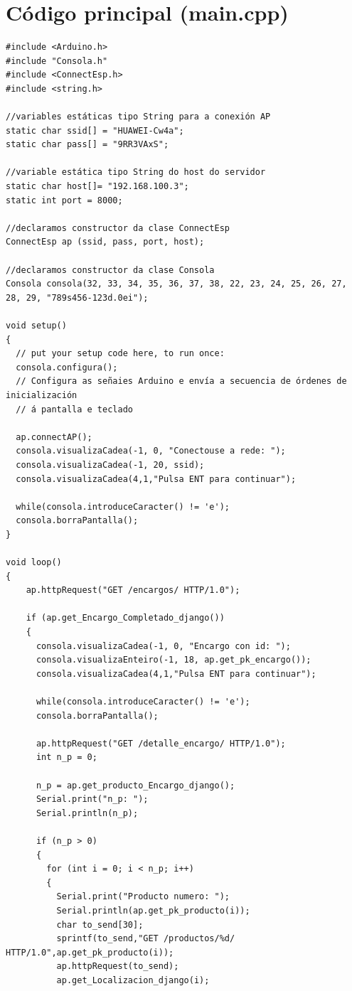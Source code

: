 \documentclass[11pt,twoside]{book}
\begin{document}
\section{Código principal (main.cpp)}

\begin{lstlisting}
#include <Arduino.h>
#include "Consola.h"
#include <ConnectEsp.h>
#include <string.h>

//variables estáticas tipo String para a conexión AP
static char ssid[] = "HUAWEI-Cw4a";
static char pass[] = "9RR3VAxS";

//variable estática tipo String do host do servidor
static char host[]= "192.168.100.3";
static int port = 8000;

//declaramos constructor da clase ConnectEsp
ConnectEsp ap (ssid, pass, port, host);

//declaramos constructor da clase Consola
Consola consola(32, 33, 34, 35, 36, 37, 38, 22, 23, 24, 25, 26, 27, 28, 29, "789s456-123d.0ei");

void setup()
{
  // put your setup code here, to run once:
  consola.configura();
  // Configura as señaies Arduino e envía a secuencia de órdenes de inicialización
  // á pantalla e teclado

  ap.connectAP();
  consola.visualizaCadea(-1, 0, "Conectouse a rede: ");
  consola.visualizaCadea(-1, 20, ssid);
  consola.visualizaCadea(4,1,"Pulsa ENT para continuar");

  while(consola.introduceCaracter() != 'e');
  consola.borraPantalla();
}

void loop()
{
    ap.httpRequest("GET /encargos/ HTTP/1.0");

    if (ap.get_Encargo_Completado_django())
    {
      consola.visualizaCadea(-1, 0, "Encargo con id: ");
      consola.visualizaEnteiro(-1, 18, ap.get_pk_encargo());
      consola.visualizaCadea(4,1,"Pulsa ENT para continuar");

      while(consola.introduceCaracter() != 'e');
      consola.borraPantalla();

      ap.httpRequest("GET /detalle_encargo/ HTTP/1.0");
      int n_p = 0;

      n_p = ap.get_producto_Encargo_django();
      Serial.print("n_p: ");
      Serial.println(n_p);

      if (n_p > 0)
      {
        for (int i = 0; i < n_p; i++)
        {
          Serial.print("Producto numero: ");
          Serial.println(ap.get_pk_producto(i));
          char to_send[30];
          sprintf(to_send,"GET /productos/%d/ HTTP/1.0",ap.get_pk_producto(i));
          ap.httpRequest(to_send);
          ap.get_Localizacion_django(i);


\end{lstlisting}
\end{document}
